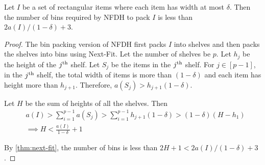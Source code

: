\begin{lemma}
\label{thm:nfdh-tall}
Let $I$ be a set of rectangular items where each item has width at most $\delta$.
Then the number of bins required by NFDH to pack $I$ is less than $2a(I)/(1-\delta) + 3$.
\end{lemma}
\begin{proof}
The bin packing version of NFDH first packs $I$ into shelves
and then packs the shelves into bins using Next-Fit.
Let the number of shelves be $p$.
Let $h_j$ be the height of the $j^{\textrm{th}}$ shelf.
Let $S_j$ be the items in the $j^{\textrm{th}}$ shelf.
For $j \in [p-1]$, in the $j^{\textrm{th}}$ shelf, the total width of items is
more than $(1-\delta)$ and each item has height more than $h_{j+1}$.
Therefore, $a(S_j) > h_{j+1}(1-\delta)$.

Let $H$ be the sum of heights of all the shelves. Then
\begin{align*}
& a(I) > \sum_{i=1}^{p-1} a(S_j) > \sum_{i=1}^{p-1} h_{j+1}(1-\delta) > (1-\delta)(H - h_1)
\\ &\implies H < \frac{a(I)}{1-\delta} + 1
\end{align*}

By \cref{thm:next-fit}, the number of bins is less than $2H + 1 < 2a(I)/(1-\delta) + 3$.
\end{proof}

